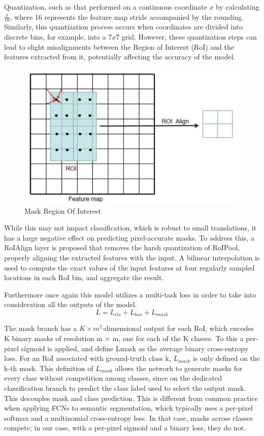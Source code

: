 Quantization, such as that performed on a continuous coordinate $x$ by calculating \(\frac{x}{16}\), where 16 represents the feature map stride accompanied
by the rounding. Similarly, this quantization process occurs when coordinates are divided into discrete bins, for example, into a $7x7$ grid. However, these 
quantization steps can lead to slight misalignments between the Region of Interest (RoI) and the features extracted from it, potentially affecting the accuracy 
of the model.

\begin{figure}[h!]
    \centering
    \includegraphics[scale=0.35]{Figures/mask-r-cnn-roi-align.png}
    \caption{Mask Region Of Interest}
    \label{fig:roi-align}
\end{figure}

While this may not impact classification, which is robust to small translations, it has a large negative effect on predicting pixel-accurate masks.
To address this, a RoIAlign layer is proposed that removes the harsh quantization of RoIPool, properly aligning the extracted features with the input. 
A bilinear interpolation is used to compute the exact values of the input features at four regularly sampled locations in each RoI bin, and aggregate 
the result.

\newpage
Furthermore once again this model utilizes a multi-task loss in order to take into consideration all the outputs of the model.
\[
L = L_{cls} + L_{box} + L_{mask} 
\]
 
The mask branch has a $K \times m^2$-dimensional output for each RoI, which encodes K binary masks of resolution m × m, one for each of the K classes.
To this a per-pixel sigmoid is applied, and define Lmask as the average binary cross-entropy loss. For an RoI associated with ground-truth class k, 
$L_{mask}$ is only defined on the k-th mask. This definition of $L_{mask}$ allows the network to generate masks for every class without competition 
among classes, since on the dedicated classification branch to predict the class label used to select the output mask. This decouples mask and 
class prediction. This is different from common practice when applying FCNs to semantic segmentation, which typically uses a per-pixel softmax and a 
multinomial cross-entropy loss. In that case, masks across classes compete; in our case, with a per-pixel sigmoid and a binary
loss, they do not.


